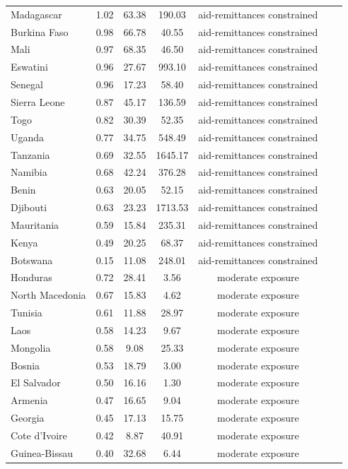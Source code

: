 \documentclass[fleqn,10pt,twocolumn]{wlscirep}
\begin{document}
\begin{longtable}{lrccccc}
	Madagascar & 1.02 & 63.38 & 190.03 & aid-remittances constrained \\
	Burkina Faso & 0.98 & 66.78 & 40.55 & aid-remittances constrained \\
	Mali & 0.97 & 68.35 & 46.50 & aid-remittances constrained \\
	Eswatini & 0.96 & 27.67 & 993.10 & aid-remittances constrained \\
	Senegal & 0.96 & 17.23 & 58.40 & aid-remittances constrained \\
	Sierra Leone & 0.87 & 45.17 & 136.59 & aid-remittances constrained \\
	Togo & 0.82 & 30.39 & 52.35 & aid-remittances constrained \\
	Uganda & 0.77 & 34.75 & 548.49 & aid-remittances constrained \\
	Tanzania & 0.69 & 32.55 & 1645.17 & aid-remittances constrained \\
	Namibia & 0.68 & 42.24 & 376.28 & aid-remittances constrained \\
	Benin & 0.63 & 20.05 & 52.15 & aid-remittances constrained \\
	Djibouti & 0.63 & 23.23 & 1713.53 & aid-remittances constrained \\
	Mauritania & 0.59 & 15.84 & 235.31 & aid-remittances constrained \\
	Kenya & 0.49 & 20.25 & 68.37 & aid-remittances constrained \\
	Botswana & 0.15 & 11.08 & 248.01 & aid-remittances constrained \\
	Honduras & 0.72 & 28.41 & 3.56 & moderate exposure \\
	North Macedonia & 0.67 & 15.83 & 4.62 & moderate exposure \\
	Tunisia & 0.61 & 11.88 & 28.97 & moderate exposure \\
	Laos & 0.58 & 14.23 & 9.67 & moderate exposure \\
	Mongolia & 0.58 & 9.08 & 25.33 & moderate exposure \\
	Bosnia & 0.53 & 18.79 & 3.00 & moderate exposure \\
	El Salvador & 0.50 & 16.16 & 1.30 & moderate exposure \\
	Armenia & 0.47 & 16.65 & 9.04 & moderate exposure \\
	Georgia & 0.45 & 17.13 & 15.75 & moderate exposure \\
	Cote d'Ivoire & 0.42 & 8.87 & 40.91 & moderate exposure \\
	Guinea-Bissau & 0.40 & 32.68 & 6.44 & moderate exposure \\

\end{longtable}
\end{document}
